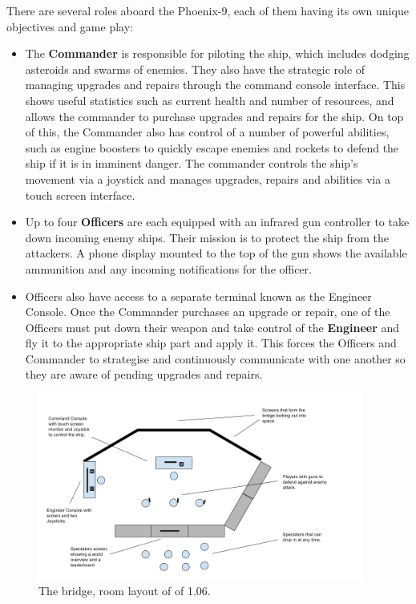 \documentclass[a4paper,11pt]{article}
\begin{document}
There are several roles aboard the Phoenix-9, each of them having its own unique objectives and game play:

\begin{itemize}[noitemsep,topsep=.5ex]
  \item The \textbf{Commander} is responsible for piloting the ship, which includes dodging asteroids and swarms of enemies. They also have the strategic role of managing upgrades and repairs through the command console interface. This shows useful statistics such as current health and number of resources, and allows the commander to purchase upgrades and repairs for the ship. On top of this, the Commander also has control of a number of powerful abilities, such as engine boosters to quickly escape enemies and rockets to defend the ship if it is in imminent danger. 
  The commander controls the ship's movement via a joystick and manages upgrades, repairs and abilities via a touch screen interface. 

  \item Up to four \textbf{Officers} are each equipped with an infrared gun controller to take down incoming enemy ships. Their mission is to protect the ship from the attackers. A phone display mounted to the top of the gun shows the available ammunition and any incoming notifications for the officer.

  \item Officers also have access to a separate terminal known as the Engineer Console. Once the Commander purchases an upgrade or repair, one of the Officers must put down their weapon and take control of the \textbf{Engineer} and fly it to the appropriate ship part and apply it. This forces the Officers and Commander to strategise and continuously communicate with one another so they are aware of pending upgrades and repairs.
\end{itemize}

\begin{figure}[h!]
	\centering
    \includegraphics[width=0.95\textwidth]{images/roomCropped}
    \caption{The bridge, room layout of of 1.06.}
    \label{fig:room_layout}
\end{figure}
\end{document}
